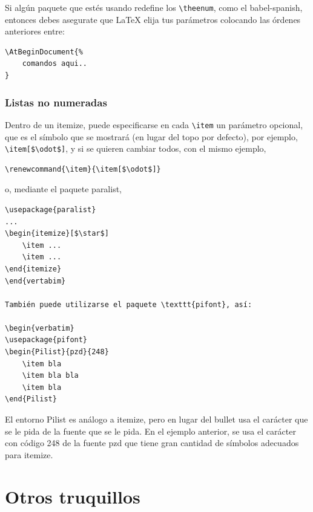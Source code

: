 \documentclass[12pt,a4paper, oneside]{report}
\begin{document}
Si algún paquete que estés usando redefine los \verb+\theenum+, como el babel-spanish, entonces debes asegurate que LaTeX elija tus parámetros colocando las órdenes anteriores entre:

\begin{verbatim}
\AtBeginDocument{%
	comandos aqui..
}
\end{verbatim}

\subsection{Listas no numeradas}
Dentro de un itemize, puede especificarse en cada \verb+\item+  un parámetro opcional, que es el símbolo que se mostrará (en lugar del topo por defecto), por ejemplo, \verb+\item[$\odot$]+, y si se quieren cambiar todos, con el mismo ejemplo,

\begin{verbatim}
\renewcommand{\item}{\item[$\odot$]}
\end{verbatim}

o, mediante el paquete paralist,
\begin{verbatim}
\usepackage{paralist}
...
\begin{itemize}[$\star$]
	\item ...
	\item ...
\end{itemize}
\end{vertabim}

También puede utilizarse el paquete \texttt{pifont}, así:

\begin{verbatim}
\usepackage{pifont}
\begin{Pilist}{pzd}{248}
	\item bla
	\item bla bla
	\item bla
\end{Pilist}
\end{verbatim}

El entorno Pilist es análogo a itemize, pero en lugar del bullet usa el carácter que se le pida de la fuente que se le pida. En el ejemplo anterior, se usa el carácter con código 248 de la fuente pzd que tiene gran cantidad de símbolos adecuados para itemize.


\chapter{Otros truquillos}
\end{document}
